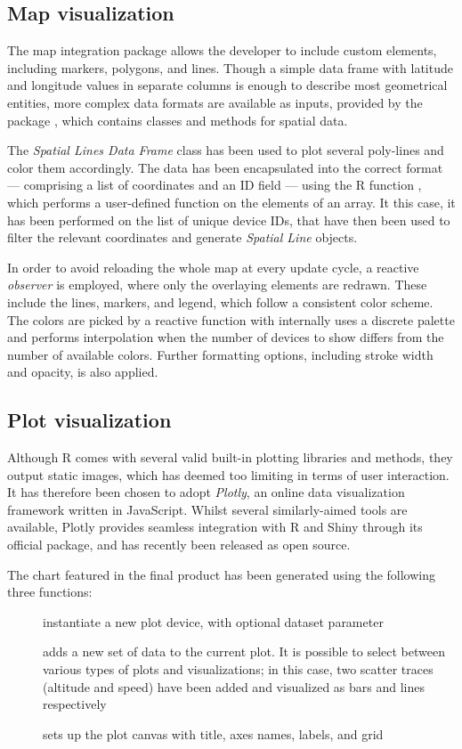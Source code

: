 \subsection{Map visualization}
The map integration package  allows the developer to include custom elements, including markers, polygons, and lines.
Though a simple data frame with latitude and longitude values in separate columns is enough to describe most geometrical entities, more complex data formats are available as inputs, provided by the package , which contains classes and methods for spatial data.

The \emph{Spatial Lines Data Frame} class has been used to plot several poly-lines and color them accordingly.
The data has been encapsulated into the correct format --- comprising a list of coordinates and an ID field --- using the R function , which performs a user-defined function on the elements of an array.
It this case, it has been performed on the list of unique device IDs, that have then been used to filter the relevant coordinates and generate \emph{Spatial Line} objects.

In order to avoid reloading the whole map at every update cycle, a reactive \emph{observer} is employed, where only the overlaying elements are redrawn.
These include the lines, markers, and legend, which follow a consistent color scheme.
The colors are picked by a reactive function with internally uses a discrete palette and performs interpolation when the number of devices to show differs from the number of available colors.
Further formatting options, including stroke width and opacity, is also applied.


\subsection{Plot visualization}
Although R comes with several valid built-in plotting libraries and methods, they output static images, which has deemed too limiting in terms of user interaction.
It has therefore been chosen to adopt \emph{Plotly}, an online data visualization framework written in JavaScript.
Whilst several similarly-aimed tools are available, Plotly provides seamless integration with R and Shiny through its official package, and has recently been released as open source.

The chart featured in the final product has been generated using the following three functions:
\begin{description}
	\item[] instantiate a new plot device, with optional dataset parameter
	\item[] adds a new set of data to the current plot. It is possible to select between various types of plots and visualizations; in this case, two scatter traces (altitude and speed) have been added and visualized as bars and lines respectively
	\item[] sets up the plot canvas with title, axes names, labels, and grid
\end{description}
